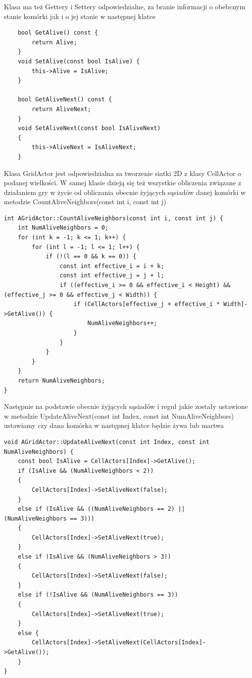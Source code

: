 \documentclass[a4paper,12pt,reqno]{article}
\begin{document}
Klasa ma też Gettery i Settery odpowiedzialne, za branie informacji o obebcnym stanie komórki jak i o jej stanie w następnej klatce
\begin{lstlisting}
	bool GetAlive() const {
		return Alive;
	}
	void SetAlive(const bool IsAlive) {
		this->Alive = IsAlive;
	}

	bool GetAliveNext() const {
		return AliveNext;
	}
	void SetAliveNext(const bool IsAliveNext)
	{
		this->AliveNext = IsAliveNext;
	}
\end{lstlisting}

Klasa GridActor jest odpowiedzialna za tworzenie siatki 2D z klasy CellActor o podanej wielkości. W samej klasie dzieją się też wszystkie obliczenia związane z działaniem gry w życie od obliczania obecnie żyjących sąsiadów danej komórki w metodzie CountAliveNeighbors(const int i, const int j)

\begin{lstlisting}
int AGridActor::CountAliveNeighbors(const int i, const int j) {
	int NumAliveNeighbors = 0;
	for (int k = -1; k <= 1; k++) {
		for (int l = -1; l <= 1; l++) {
			if (!(l == 0 && k == 0)) {
				const int effective_i = i + k;
				const int effective_j = j + l;
				if ((effective_i >= 0 && effective_i < Height) && (effective_j >= 0 && effective_j < Width)) {
					if (CellActors[effective_j + effective_i * Width]->GetAlive()) {
						NumAliveNeighbors++;
					}
				}
			}
		}
	}
	return NumAliveNeighbors;
}
\end{lstlisting}

Następnie na podstawie obecnie żyjących sąsiadów i reguł jakie zostały ustawione w metodzie UpdateAliveNext(const int Index, const int NumAliveNeighbors) ustawiamy czy dana komórka w następnej klatce będzie żywa lub martwa

\begin{lstlisting}
void AGridActor::UpdateAliveNext(const int Index, const int NumAliveNeighbors) {
	const bool IsAlive = CellActors[Index]->GetAlive();
	if (IsAlive && (NumAliveNeighbors < 2))
	{
		CellActors[Index]->SetAliveNext(false);
	}
	else if (IsAlive && ((NumAliveNeighbors == 2) || (NumAliveNeighbors == 3)))
	{
		CellActors[Index]->SetAliveNext(true);
	}
	else if (IsAlive && (NumAliveNeighbors > 3))
	{
		CellActors[Index]->SetAliveNext(false);
	}
	else if (!IsAlive && (NumAliveNeighbors == 3))
	{
		CellActors[Index]->SetAliveNext(true);
	}
	else {
		CellActors[Index]->SetAliveNext(CellActors[Index]->GetAlive());
	}
}
\end{lstlisting}
\end{document}
